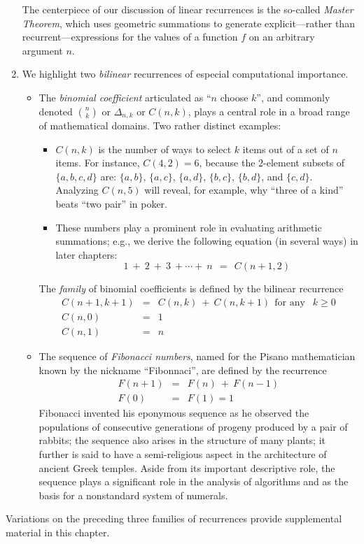 \begin{enumerate}
\smallskip

The centerpiece of our discussion of linear recurrences is the
so-called {\em Master Theorem}, which uses geometric summations to
generate explicit---rather than recurrent---expressions for the values
of a function $f$ on an arbitrary argument $n$.

\item
We highlight two {\it bilinear} recurrences of especial computational
importance.
  \begin{itemize}
  \item
The {\it binomial coefficient} articulated as ``$n$ choose $k$'', and
commonly denoted $\displaystyle {n \choose k}$ or $\Delta_{n,k}$ or
$C(n,k)$, plays a central role in a broad range of mathematical
domains.  Two rather distinct examples:

       \begin{itemize}
       \item
$C(n,k)$ is the number of ways to select $k$ items out of a set of $n$
items.  For instance, $C(4,2) =6$, because the $2$-element subsets of
$\{a, b, c, d\}$ are: $\{a, b\}$, $\{a, c\}$, $\{a, d\}$,  $\{b, c\}$,
$\{b, d\}$,  and $\{c,d\}$.  Analyzing $C(n, 5)$ will reveal, for
example, why ``three of a kind'' beats ``two pair'' in poker.
       \item
These numbers play a prominent role in evaluating arithmetic
summations; e.g., we derive the following equation (in several ways)
in later chapters:
\[ 1 \ + \ 2 \ + \ 3 \ + \cdots + \ n \ \ = \ \ C(n+1, 2) \]
       \end{itemize}
The {\em family} of binomial coefficients is defined by the bilinear
recurrence
\begin{eqnarray*}
C(n+1, k+1) & = & C(n, k) \ + \ C(n, k+1) \ \ \mbox{for any } \ \ k \geq 0 \\
C(n, 0) & = & 1 \\
C(n, 1) & = & n 
\end{eqnarray*}

  \item
The sequence of {\it Fibonacci numbers}, named for the Pisano
mathematician known by the nickname ``Fibonnaci'', are defined by the
recurrence
\begin{eqnarray*}
F(n+1) & = & F(n) \ + \ F(n-1) \\
F(0) & = & F(1) = 1
\end{eqnarray*}
Fibonacci invented his eponymous sequence as he observed the
populations of consecutive generations of progeny produced by a pair
of rabbits; the sequence also arises in the structure of many plants;
it further is said to have a semi-religious aspect in the architecture
of ancient Greek temples.
Aside from its important descriptive role, the sequence plays a
significant role in the analysis of algorithms and as the basis for a
nonstandard system of numerals.
  \end{itemize}
\end{enumerate}
Variations on the preceding three families of recurrences provide
supplemental material in this chapter.


